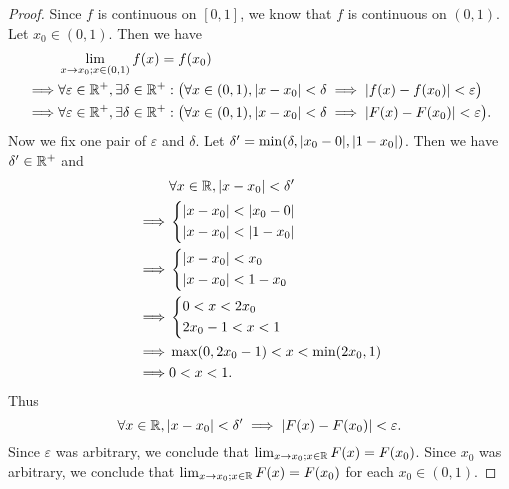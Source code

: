 \begin{proof}
  Since \(f\) is continuous on \([0, 1]\), we know that \(f\) is continuous on \((0, 1)\).
  Let \(x_0 \in (0, 1)\).
  Then we have
  \begin{align*}
             & \lim_{x \to x_0 ; x \in (0, 1)} f(x) = f(x_0)                                                                                                              \\
    \implies & \forall \varepsilon \in \mathbb{R}^+, \exists \delta \in \mathbb{R}^+ : \big(\forall x \in (0, 1), \left\lvert x - x_0\right\rvert < \delta \implies \left\lvert f(x) - f(x_0)\right\rvert < \varepsilon\big)  \\
    \implies & \forall \varepsilon \in \mathbb{R}^+, \exists \delta \in \mathbb{R}^+ : \big(\forall x \in (0, 1), \left\lvert x - x_0\right\rvert < \delta \implies \left\lvert F(x) - F(x_0)\right\rvert < \varepsilon\big).
  \end{align*}
  Now we fix one pair of \(\varepsilon\) and \(\delta\).
  Let \(\delta' = \min(\delta, \abs{x_0 - 0}, \abs{1 - x_0})\).
  Then we have \(\delta' \in \mathbb{R}^+\) and
  \begin{align*}
             & \forall x \in \mathbb{R}, \left\lvert x - x_0\right\rvert < \delta' \\
    \implies & \begin{dcases}
                 \left\lvert x - x_0\right\rvert < \left\lvert x_0 - 0\right\rvert \\
                 \left\lvert x - x_0\right\rvert < \left\lvert1 - x_0\right\rvert
               \end{dcases}             \\
    \implies & \begin{dcases}
                 \left\lvert x - x_0\right\rvert < x_0 \\
                 \left\lvert x - x_0\right\rvert < 1 - x_0
               \end{dcases}                    \\
    \implies & \begin{dcases}
                 0 < x < 2x_0 \\
                 2x_0 - 1 < x < 1
               \end{dcases}                           \\
    \implies & \max(0, 2x_0 - 1) < x < \min(2x_0, 1)     \\
    \implies & 0 < x < 1.
  \end{align*}
  Thus
  \[
    \forall x \in \mathbb{R}, \left\lvert x - x_0\right\rvert < \delta' \implies \left\lvert F(x) - F(x_0)\right\rvert < \varepsilon.
  \]
  Since \(\varepsilon\) was arbitrary, we conclude that \(\lim_{x \to x_0 ; x \in \mathbb{R}} F(x) = F(x_0)\).
  Since \(x_0\) was arbitrary, we conclude that \(\lim_{x \to x_0 ; x \in \mathbb{R}} F(x) = F(x_0)\) for each \(x_0 \in (0, 1)\).


\end{proof}

